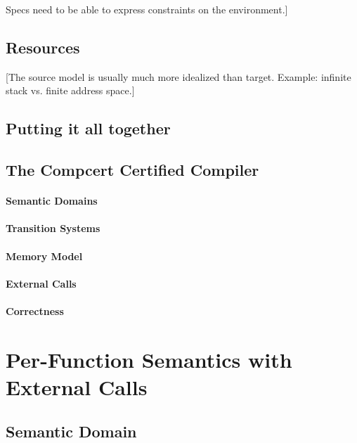 \documentclass[sigplan,10pt,review,anonymous]{acmart}
\begin{document}
Specs need to be able to express constraints on the environment.]


\subsection{Resources} %

[The source model is usually much more idealized than target.
Example: infinite stack vs. finite address space.]


\subsection{Putting it all together} %


\subsection{The Compcert Certified Compiler} %

\paragraph{Semantic Domains}
\paragraph{Transition Systems}
\paragraph{Memory Model}
\paragraph{External Calls}
\paragraph{Correctness}



\section{Per-Function Semantics with External Calls} %

\subsection{Semantic Domain}
\end{document}
